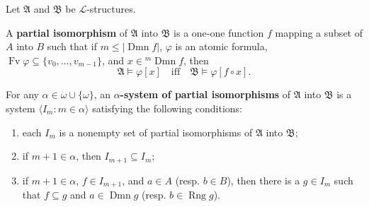Let $\mathfrak{A}$ and $\mathfrak{B}$ be $\mathcal{L}$-structures.

A \textbf{partial isomorphism} of $\mathfrak{A}$ into $\mathfrak{B}$ is a one-one function $f$ mapping a subset of $A$ into $B$ such that if $m \leq |\operatorname{Dmn} f|$, $\varphi$ is an atomic formula, $\operatorname{Fv} \varphi \subseteq \{v_0, \ldots, v_{m-1}\}$, and $x \in {}^m \operatorname{Dmn} f$, then
$$\mathfrak{A} \models \varphi[x] \quad\text{iff}\quad \mathfrak{B} \models \varphi[f \circ x].$$

For any $\alpha \in \omega \cup \{\omega\}$, an \textbf{$\alpha$-system of partial isomorphisms} of $\mathfrak{A}$ into $\mathfrak{B}$ is a system $\langle I_m : m \in \alpha \rangle$ satisfying the following conditions:
\begin{enumerate}
\item[(i)] each $I_m$ is a nonempty set of partial isomorphisms of $\mathfrak{A}$ into $\mathfrak{B}$;
\item[(ii)] if $m + 1 \in \alpha$, then $I_{m+1} \subseteq I_m$;
\item[(iii)] if $m + 1 \in \alpha$, $f \in I_{m+1}$, and $a \in A$ (resp. $b \in B$), then there is a $g \in I_m$ such that $f \subseteq g$ and $a \in \operatorname{Dmn} g$ (resp. $b \in \operatorname{Rng} g$).
\end{enumerate}
